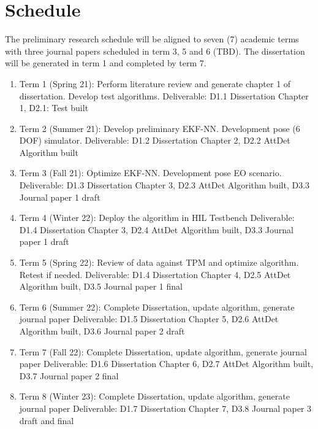 \section{Schedule}\label{CHAP1_6}
The preliminary research schedule will be aligned to seven (7) academic terms with three journal papers scheduled in term 3, 5 and 6 (TBD). The dissertation will be generated in term 1 and completed by term 7.
\begin{enumerate}
    \item Term 1 (Spring 21):  Perform literature review and generate chapter 1 of dissertation. Develop test algorithms.
    Deliverable: D1.1 Dissertation Chapter 1, D2.1: Test built

    \item Term 2 (Summer 21):  Develop preliminary EKF-NN. Development pose (6 DOF) simulator.  
    Deliverable: D1.2 Dissertation Chapter 2, D2.2 AttDet Algorithm built 

    \item Term 3 (Fall 21): Optimize EKF-NN. Development pose EO scenario.  
    Deliverable: D1.3 Dissertation Chapter 3, D2.3 AttDet Algorithm built, D3.3 Journal paper 1 draft
    
    \item Term 4 (Winter 22): Deploy the algorithm in HIL Testbench
    Deliverable: D1.4 Dissertation Chapter 3, D2.4 AttDet Algorithm built, D3.3 Journal paper 1 draft
    

    \item Term 5 (Spring 22): Review of data against TPM and optimize algorithm. Retest if needed. 
    Deliverable: D1.4 Dissertation Chapter 4, D2.5 AttDet Algorithm built, D3.5 Journal paper 1 final

    \item Term 6 (Summer 22): Complete Dissertation, update algorithm, generate journal paper 
    Deliverable: D1.5 Dissertation Chapter 5, D2.6 AttDet Algorithm built, D3.6 Journal paper 2 draft

    \item Term 7 (Fall 22): Complete Dissertation, update algorithm, generate journal paper
    Deliverable: D1.6 Dissertation Chapter 6, D2.7 AttDet Algorithm built, D3.7 Journal paper 2 final

    \item Term 8 (Winter 23): Complete Dissertation, update algorithm, generate journal paper
    Deliverable: D1.7 Dissertation Chapter 7, D3.8 Journal paper 3 draft and final

\end{enumerate}

